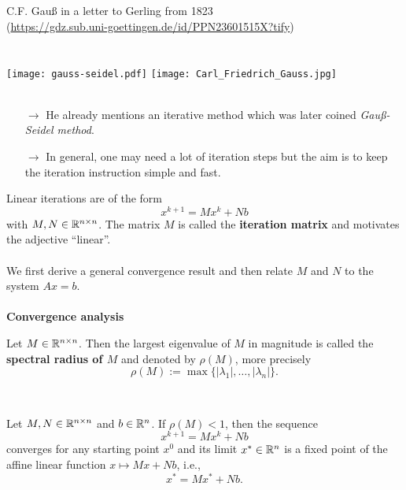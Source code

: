  
\begin{frame}
~\\~\\
C.F. Gauß in a letter to Gerling from 1823\\ 
{\small (\url{https://gdz.sub.uni-goettingen.de/id/PPN23601515X?tify})}\\~\\~\\
\texttt{[image: gauss-seidel.pdf]}
\texttt{[image: Carl\_Friedrich\_Gauss.jpg]}
~\\~\\
\begin{itemize}
	\item[$\rightarrow$] He already mentions an iterative method which was later coined \textit{Gauß-Seidel method}.\\
\item[$\rightarrow$] In general, one may need a lot of iteration steps but the aim is to keep the iteration instruction simple and fast.
\end{itemize}
\end{frame}
\begin{frame}
Linear iterations are of the form 
$$x^{k+1}=Mx^k+Nb$$
with $M,N\in{\mathbb{R}}^{n\times n}$. The matrix $M$
is called the \textbf{\color{defgruen}iteration matrix} and motivates the adjective ``linear''.\\[0.4cm]
 ~\\
We first derive a general convergence result and then relate $M$ and $N$ to the system $Ax=b$.\\~\\
\textbf{Convergence analysis}
\begin{defi}
	Let $M \in {\mathbb{R}}^{n\times n}$. Then the largest eigenvalue of $M$ in magnitude is called the \textbf{spectral radius of $M$} and denoted by $\rho(M)$, more precisely 
	$$\rho(M):=\max \{|\lambda_1|,\ldots, |\lambda_n|\}.$$
\end{defi}
~\\
\begin{theo} \label{theo:fixedpointiteration}
Let $M,N\in{\mathbb{R}}^{n\times n}$ and $b\in {\mathbb{R}}^n$. If $\rho(M)<1$, then the sequence $$x^{k+1}=Mx^k+Nb$$ converges for any starting point $x^0$ and its limit $x^* \in {\mathbb{R}}^n$ is a fixed point of the affine linear function $x\mapsto Mx+Nb$, i.e.,
$$ x^* = Mx^*+Nb.$$
\end{theo} \vspace{-0.5cm}
\end{frame}

